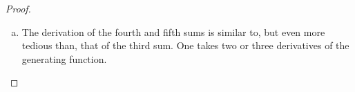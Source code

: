 \begin{proof}
\begin{enumerate}[(a)]
{\noindent \emph{Alternate proof 3:} uses the generating function
\begin{align}\label{eq:INTpowergenfnlexp}
e^{x}+e^{2x}+e^{3x}+\cdots+e^{nx}&=e^{x}\left(1+e^{x}+e^{2x}+e^{3x}+\cdots+e^{(n-1)x}
\right)
\notag\\
&=e^x\frac{e^{nx}-1}{e^x-1}\notag\\
&=\frac{e^{(n+1)x}-e^x}{e^x-1}
\end{align}
by \eqref{eq:INTgeomsum} with $r=e^x$. When we differentiate the
left hand side and then take the limit $x\rightarrow 0$ we get
\begin{align*}
\lim_{x\rightarrow 0}\diff{}{x}\big[e^{x}+e^{2x}+e^{3x}+\cdots+e^{nx}\big]
&=\lim_{x\rightarrow 0}\big[1e^{x}+2e^{2x}+3e^{3x}+\cdots+ne^{nx}\big] \\
&=1+2+3+\cdots+n
\end{align*}
which is exactly the sum that we are trying to evaluate. So, by \eqref{eq:INTpowergenfnl},
\begin{align*}
1+2+3+\cdots+n&=\lim_{x\rightarrow 0}\diff{}{x}\Big[\frac{e^{(n+1)x}-e^x}{e^x-1}\Big]\\
&=\lim_{x\rightarrow 0}
\Big[\frac{((n+1)e^{(n+1)x}-e^x)(e^x-1)-(e^{(n+1)x}-e^x)e^x}{(e^x-1)^2}\Big]\\
&=\lim_{x\rightarrow 0}
\Big[e^x\frac{ne^{(n+1)x}-(n+1)e^{nx}+1}{(e^x-1)^2}\Big]\\
&=\lim_{x\rightarrow 0}
\Big[\frac{ne^{(n+1)x}-(n+1)e^{nx}+1}{(e^x-1)^2}\Big]\\
&=\lim_{x\rightarrow 0}
\Big[\frac{n(n+1)e^{(n+1)x}-n(n+1)e^{nx}}{2(e^x-1)e^x}\Big]\\
&=\lim_{x\rightarrow 0}
\Big[\frac{n(n+1)e^{nx}-n(n+1)e^{(n-1)x}}{2(e^x-1)}\Big]\\
&=\lim_{x\rightarrow 0}
\Big[\frac{n^2(n+1)e^{nx}-n(n+1)(n-1)e^{(n-1)x}}{2 e^x}\Big]\\
&=\frac{n^2(n+1)-n(n+1)(n-1)}{2}\\
&=\frac{(n+1)[n^2-n(n-1)]}{2}\\
&=\frac{n(n+1)}{2}
\end{align*}


}%

\item The derivation of the fourth and fifth sums is similar to, but
even more tedious than, that of the third sum. One takes two or three
derivatives of the generating function.


\end{enumerate}
\end{proof}
